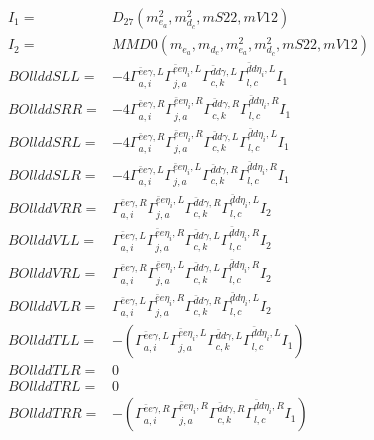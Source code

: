 \documentclass[A4,landscape]{article}
\begin{document}
\begin{align} 
I_1 = & D_{27}(m^2_{e_{{a}}}, m^2_{d_{{c}}}, mS22, mV12) \\ 
I_2 = & MMD0(m_{e_{{a}}}, m_{d_{{c}}}, m^2_{e_{{a}}}, m^2_{d_{{c}}}, mS22, mV12) \\ 
  BOllddSLL= & -4  \Gamma^{\bar{e}e \gamma ,L}_{a, i} \Gamma^{\bar{e}e \eta_i ,L}_{j, a} \Gamma^{\bar{d}d \gamma ,L}_{c, k} \Gamma^{\bar{d}d \eta_i ,L}_{l, c} I_1 \\ 
  BOllddSRR= & -4  \Gamma^{\bar{e}e \gamma ,R}_{a, i} \Gamma^{\bar{e}e \eta_i ,R}_{j, a} \Gamma^{\bar{d}d \gamma ,R}_{c, k} \Gamma^{\bar{d}d \eta_i ,R}_{l, c} I_1 \\ 
  BOllddSRL= & -4  \Gamma^{\bar{e}e \gamma ,R}_{a, i} \Gamma^{\bar{e}e \eta_i ,R}_{j, a} \Gamma^{\bar{d}d \gamma ,L}_{c, k} \Gamma^{\bar{d}d \eta_i ,L}_{l, c} I_1 \\ 
  BOllddSLR= & -4  \Gamma^{\bar{e}e \gamma ,L}_{a, i} \Gamma^{\bar{e}e \eta_i ,L}_{j, a} \Gamma^{\bar{d}d \gamma ,R}_{c, k} \Gamma^{\bar{d}d \eta_i ,R}_{l, c} I_1 \\ 
  BOllddVRR= &  \Gamma^{\bar{e}e \gamma ,R}_{a, i} \Gamma^{\bar{e}e \eta_i ,L}_{j, a} \Gamma^{\bar{d}d \gamma ,R}_{c, k} \Gamma^{\bar{d}d \eta_i ,L}_{l, c} I_2 \\ 
  BOllddVLL= &  \Gamma^{\bar{e}e \gamma ,L}_{a, i} \Gamma^{\bar{e}e \eta_i ,R}_{j, a} \Gamma^{\bar{d}d \gamma ,L}_{c, k} \Gamma^{\bar{d}d \eta_i ,R}_{l, c} I_2 \\ 
  BOllddVRL= &  \Gamma^{\bar{e}e \gamma ,R}_{a, i} \Gamma^{\bar{e}e \eta_i ,L}_{j, a} \Gamma^{\bar{d}d \gamma ,L}_{c, k} \Gamma^{\bar{d}d \eta_i ,R}_{l, c} I_2 \\ 
  BOllddVLR= &  \Gamma^{\bar{e}e \gamma ,L}_{a, i} \Gamma^{\bar{e}e \eta_i ,R}_{j, a} \Gamma^{\bar{d}d \gamma ,R}_{c, k} \Gamma^{\bar{d}d \eta_i ,L}_{l, c} I_2 \\ 
  BOllddTLL= & -( \Gamma^{\bar{e}e \gamma ,L}_{a, i} \Gamma^{\bar{e}e \eta_i ,L}_{j, a} \Gamma^{\bar{d}d \gamma ,L}_{c, k} \Gamma^{\bar{d}d \eta_i ,L}_{l, c} I_1) \\ 
  BOllddTLR= & 0 \\ 
  BOllddTRL= & 0 \\ 
  BOllddTRR= & -( \Gamma^{\bar{e}e \gamma ,R}_{a, i} \Gamma^{\bar{e}e \eta_i ,R}_{j, a} \Gamma^{\bar{d}d \gamma ,R}_{c, k} \Gamma^{\bar{d}d \eta_i ,R}_{l, c} I_1) \\ 
\end{align} 
\end{document}
